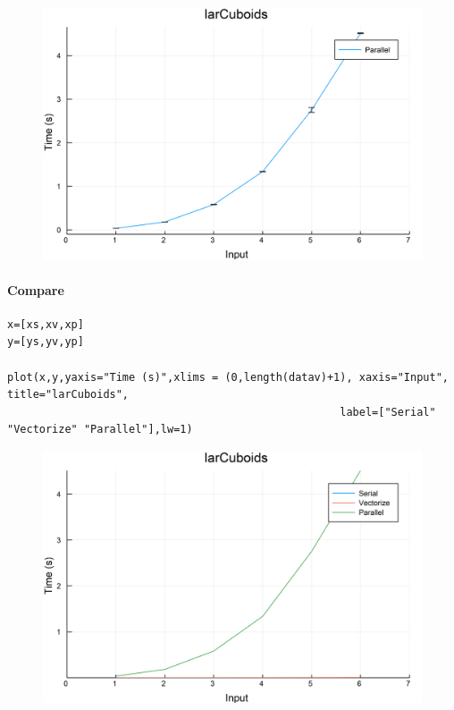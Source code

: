 \documentclass{article}
\begin{document}
\begin{figure}[h!]
\centering
\includegraphics[scale=0.06]{larCuboidsPar.png}
\end{figure}

\paragraph{Compare}
\begin{flushleft}\small
\begin{list}{}{} \item
    \begin{Verbatim}[tabsize=4]
x=[xs,xv,xp]
y=[ys,yv,yp]

plot(x,y,yaxis="Time (s)",xlims = (0,length(datav)+1), xaxis="Input", title="larCuboids",
                                                    label=["Serial" "Vectorize" "Parallel"],lw=1)
    \end{Verbatim}
\end{list}
\end{flushleft}  

\begin{figure}[h!]
\centering
\includegraphics[scale=0.06]{larCuboidsCom.png}
\end{figure}
\end{document}
